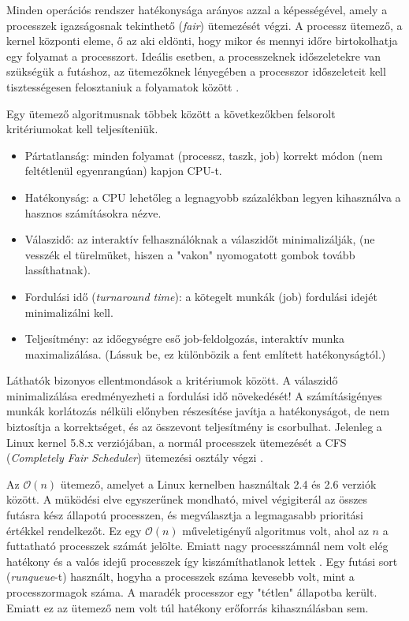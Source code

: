 \label{ch:scheduling}



Minden operációs rendszer hatékonysága arányos azzal a képességével, amely a processzek igazságosnak tekinthető (\textit{fair}) ütemezését végzi. A processz ütemező, a kernel központi eleme, ő az aki eldönti, hogy mikor és mennyi időre birtokolhatja egy folyamat a processzort. Ideális esetben, a processzeknek időszeletekre van szükségük a futáshoz, az ütemezőknek lényegében a processzor időszeleteit kell tisztességesen felosztaniuk a folyamatok között \cite{tanenbaum1999operacios}.

Egy ütemező algoritmusnak többek között a következőkben felsorolt kritériumokat kell teljesíteniük.
\begin{itemize}
	\item Pártatlanság: minden folyamat (processz, taszk, job) korrekt módon (nem feltétlenül egyenrangúan) kapjon CPU-t.
	\item Hatékonyság: a CPU lehetőleg a legnagyobb százalékban legyen kihasználva a hasznos számításokra nézve.
	\item Válaszidő: az interaktív felhasználóknak a válaszidőt minimalizálják, (ne vesszék el türelmüket, hiszen a "vakon" nyomogatott gombok tovább lassíthatnak).
	\item Fordulási idő (\textit{turnaround time}): a kötegelt munkák (job) fordulási idejét minimalizálni kell.
	\item Teljesítmény: az időegységre eső job-feldolgozás, interaktív munka maximalizálása.
(Lássuk be, ez különbözik a fent említett hatékonyságtól.)
\end{itemize}
Láthatók bizonyos ellentmondások a kritériumok között. A válaszidő minimalizálása eredményezheti a fordulási idő növekedését!
A számításigényes munkák korlátozás nélküli
előnyben részesítése javítja a hatékonyságot, de nem biztosítja a korrektséget, és az összevont
teljesítmény is csorbulhat.
Jelenleg a Linux kernel 5.8.x verziójában, a normál processzek ütemezését a CFS (\textit{Completely Fair Scheduler}) ütemezési osztály végzi \cite{wong2008towards}.



Az $\mathcal{O}(n)$ ütemező, amelyet a Linux kernelben használtak 2.4 és 2.6 verziók között. A müködési elve egyszerűnek mondható, mivel végigiterál az összes futásra kész állapotú processzen, és megválasztja a legmagasabb prioritási értékkel rendelkezőt.
Ez egy $\mathcal{O}(n)$ műveletigényű algoritmus volt, ahol az $n$ a futtatható processzek számát jelölte. Emiatt nagy processzámnál nem volt elég hatékony és a valós idejű processzek így kiszámíthatlanok lettek \cite{programmersought}.
Egy futási sort (\textit{runqueue}-t) használt, hogyha a processzek száma kevesebb volt, mint a processzormagok száma. A maradék processzor egy "tétlen" állapotba került. Emiatt ez az ütemező nem volt túl hatékony erőforrás kihasználásban sem.

